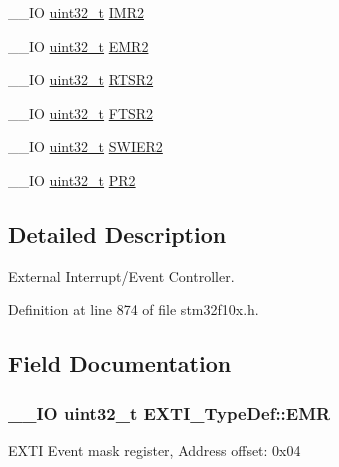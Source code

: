 \begin{DoxyCompactItemize}
\item 
\-\_\-\-\_\-\-I\-O \hyperlink{stdint_8h_a435d1572bf3f880d55459d9805097f62}{uint32\-\_\-t} \hyperlink{struct_e_x_t_i___type_def_a0d6bf1df9ad8ca71ac21d19a1a9c9375}{I\-M\-R2}
\item 
\-\_\-\-\_\-\-I\-O \hyperlink{stdint_8h_a435d1572bf3f880d55459d9805097f62}{uint32\-\_\-t} \hyperlink{struct_e_x_t_i___type_def_a36eec4d67b3fb7a34fe555be763e2347}{E\-M\-R2}
\item 
\-\_\-\-\_\-\-I\-O \hyperlink{stdint_8h_a435d1572bf3f880d55459d9805097f62}{uint32\-\_\-t} \hyperlink{struct_e_x_t_i___type_def_a9670b69baeb2f676b54403a6fd7482dc}{R\-T\-S\-R2}
\item 
\-\_\-\-\_\-\-I\-O \hyperlink{stdint_8h_a435d1572bf3f880d55459d9805097f62}{uint32\-\_\-t} \hyperlink{struct_e_x_t_i___type_def_a518a0f964908240ac335bf137c2097f3}{F\-T\-S\-R2}
\item 
\-\_\-\-\_\-\-I\-O \hyperlink{stdint_8h_a435d1572bf3f880d55459d9805097f62}{uint32\-\_\-t} \hyperlink{struct_e_x_t_i___type_def_ac537696dafad0997c5ebc4f4d21abd16}{S\-W\-I\-E\-R2}
\item 
\-\_\-\-\_\-\-I\-O \hyperlink{stdint_8h_a435d1572bf3f880d55459d9805097f62}{uint32\-\_\-t} \hyperlink{struct_e_x_t_i___type_def_a70a4f12449826cb6aeceed7ee6253752}{P\-R2}
\end{DoxyCompactItemize}


\subsection{Detailed Description}
External Interrupt/\-Event Controller. 

Definition at line 874 of file stm32f10x.\-h.



\subsection{Field Documentation}
\hypertarget{struct_e_x_t_i___type_def_a9c5bff67bf9499933959df7eb91a1bd6}{
\subsubsection[{E\-M\-R}]{\setlength{\rightskip}{0pt plus 5cm}\-\_\-\-\_\-\-I\-O {\bf uint32\-\_\-t} E\-X\-T\-I\-\_\-\-Type\-Def\-::\-E\-M\-R}}\label{struct_e_x_t_i___type_def_a9c5bff67bf9499933959df7eb91a1bd6}
E\-X\-T\-I Event mask register, Address offset\-: 0x04 

